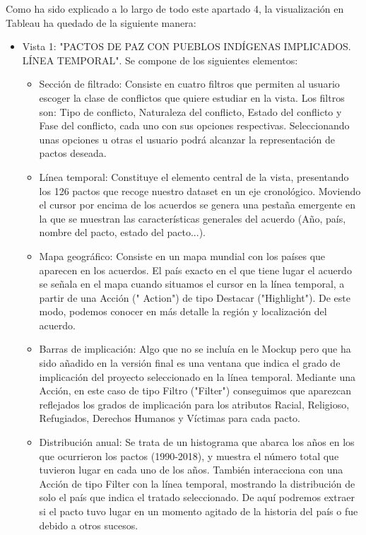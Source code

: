 \documentclass[11pt]{article}
\begin{document}
Como ha sido explicado a lo largo de todo este apartado 4, la visualización en Tableau ha quedado de la siguiente manera:
\begin{itemize}
    \item Vista 1: "PACTOS DE PAZ CON PUEBLOS INDÍGENAS IMPLICADOS. LÍNEA TEMPORAL". Se compone de los siguientes elementos:
    \begin{itemize}
        \item Sección de filtrado: Consiste en cuatro filtros que permiten al usuario escoger la clase de conflictos que quiere estudiar en la vista. Los filtros son: Tipo de conflicto, Naturaleza del conflicto, Estado del conflicto y Fase del conflicto, cada uno con sus opciones respectivas. Seleccionando unas opciones u otras el usuario podrá alcanzar la representación de pactos deseada.
        
        \item Línea temporal: Constituye el elemento central de la vista, presentando los 126 pactos que recoge nuestro dataset en un eje cronológico. Moviendo el cursor por encima de los acuerdos se genera una pestaña emergente en la que se muestran las características generales del acuerdo (Año, país, nombre del pacto, estado del pacto...).
        
        \item Mapa geográfico: Consiste en un mapa mundial con los países que aparecen en los acuerdos. El país exacto en el que tiene lugar el acuerdo se señala en el mapa cuando situamos el cursor en la línea temporal, a partir de una Acción (" Action") de tipo Destacar ("Highlight"). De este modo, podemos conocer en más detalle la región y localización del acuerdo.
        
        \item Barras de implicación: Algo que no se incluía en le Mockup pero que ha sido añadido en la versión final es una ventana que indica el grado de implicación del proyecto seleccionado en la línea temporal. Mediante una Acción, en este caso de tipo Filtro ("Filter") conseguimos que aparezcan reflejados los grados de implicación para los atributos Racial, Religioso, Refugiados, Derechos Humanos y Víctimas para cada pacto.
        
        \item Distribución anual: Se trata de un histograma que abarca los años en los que ocurrieron los pactos (1990-2018), y muestra el número total que tuvieron lugar en cada uno de los años. También interacciona con una Acción de tipo Filter con la línea temporal, mostrando la distribución de solo el país que indica el tratado seleccionado. De aquí podremos extraer si el pacto tuvo lugar en un momento agitado de la historia del país o fue debido a otros sucesos. 
    \end{itemize}
    

\end{itemize}
\end{document}
